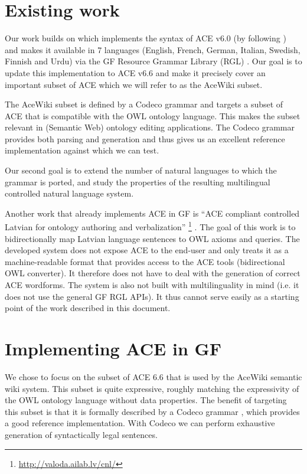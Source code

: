 \documentclass[a4paper]{article}
\begin{document}
\section{Existing work}

Our work builds on \cite{ranta:cnl2009_revised} which implements the syntax
of ACE v6.0 (by following \cite{ACE_6.0_Construction_Rules}) and makes it
available in 7 languages (English, French, German, Italian, Swedish, Finnish
and Urdu) via the GF Resource Grammar Library (RGL) \cite{ranta:lilt2009}.
Our goal is to update this implementation to ACE v6.6 and make it precisely
cover an important subset of ACE which we will refer to as the AceWiki subset.

The AceWiki subset is defined by a Codeco grammar \cite{kuhn:cnl2010_revised}
and targets a subset of ACE that is compatible with the OWL ontology language.
This makes the subset relevant in (Semantic Web) ontology editing applications.
The Codeco
grammar provides both parsing and generation and thus gives us an excellent
reference implementation against which we can test.

Our second goal is to extend the number of natural languages to which
the grammar is ported, and study the properties of the resulting multilingual
controlled natural language system.

Another work that already implements ACE in GF is
``ACE compliant controlled Latvian for ontology authoring and verbalization''
\footnote{\url{http://valoda.ailab.lv/cnl/}}
\cite{gruzitis:phd}. The goal of this work is to bidirectionally map Latvian
language sentences to OWL axioms and queries. The developed system
does not expose ACE to the end-user and only treats it as a
machine-readable format that provides access to the ACE tools
(bidirectional OWL converter). It therefore does not have to deal with the
generation of correct ACE wordforms.
The system is also not built with multilinguality in mind
(i.e. it does not use the general GF RGL APIs). It thus cannot serve easily as
a starting point of the work described in this document.


\section{Implementing ACE in GF}

We chose to focus on the subset of ACE 6.6
\cite{ACE_6.6_Construction_Rules} that is used by the AceWiki semantic wiki
system.
This subset is
quite expressive, roughly matching the expressivity of the OWL ontology
language
\cite{OWL_2_Web_Ontology_Language_Document_Overview}
without data properties.
The benefit of
targeting this subset is that it is formally described by a Codeco grammar
\cite{kuhn:cnl2010_revised}, which provides a good reference implementation.
With Codeco we can perform exhaustive generation of syntactically legal
sentences.
\end{document}
